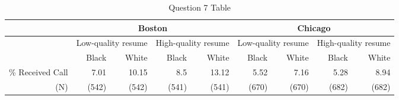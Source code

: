 \documentclass[11pt,notitlepage]{article}\usepackage[]{graphicx}\usepackage[]{color}
\begin{document}
\begin{table}[H]
  \centering
  \caption{Question 7 Table}
    \begin{tabular}{rrrrrrrrr}
    \toprule
          & \multicolumn{4}{c}{Boston}    & \multicolumn{4}{c}{Chicago} \\
    \midrule
          & \multicolumn{2}{c}{Low-quality resume} & \multicolumn{2}{c}{High-quality resume } & \multicolumn{2}{c}{Low-quality resume} & \multicolumn{2}{c}{High-quality resume } \\
          & Black & White & Black & White & Black & White & Black & White \\
    \% Received Call & 7.01  & 10.15 & 8.5   & 13.12 & 5.52  & 7.16  & 5.28  & 8.94 \\
    (N)   & (542) & (542) & (541) & (541) & (670) & (670) & (682) & (682) \\
    \bottomrule
    \end{tabular}%
  \label{tab:addlabel}%
\end{table}%
\end{document}
